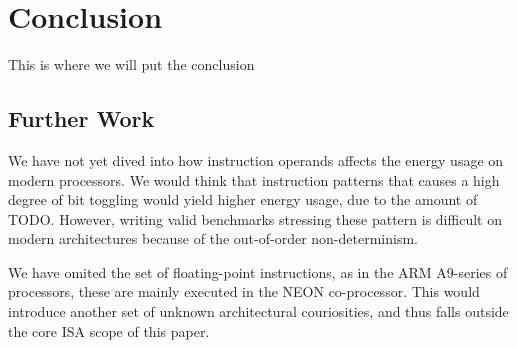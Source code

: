 \section{Conclusion}
This is where we will put the conclusion

\subsection{Further Work}

We have not yet dived into how instruction operands affects the energy usage on
modern processors. We would think that instruction patterns that causes a high
degree of bit toggling would yield higher energy usage, due to the amount of
TODO. However, writing valid benchmarks stressing these pattern is difficult on
modern architectures because of the out-of-order non-determinism.

We have omited the set of floating-point instructions, as in the ARM A9-series
of processors, these are mainly executed in the NEON co-processor. This would
introduce another set of unknown architectural couriosities, and thus falls
outside the core ISA scope of this paper.
